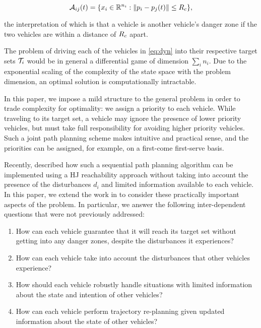 \begin{equation}
\mathcal{A}_{ij}(t) = \{x_i \in \mathbb{R}^{n_i}: \|p_i - p_j(t)\| \le R_c \},
\end{equation}

\noindent the interpretation of which is that a vehicle is another vehicle's danger zone if the two vehicles are within a distance of $R_c$ apart.

The problem of driving each of the vehicles in \eqref{eq:dyn} into their respective target sets $\mathcal{T}_i$ would be in general a differential game of dimension $\sum_i n_i$. Due to the exponential scaling of the complexity of the state space with the problem dimension, an optimal solution is computationally intractable.

In this paper, we impose a mild structure to the general problem in order to trade complexity for optimality: we assign a priority to each vehicle. While traveling to its target set, a vehicle may ignore the presence of lower priority vehicles, but must take full responsibility for avoiding higher priority vehicles. Such a joint path planning scheme makes intuitive and practical sense, and the priorities can be assigned, for example, on a first-come first-serve basis.

Recently, \cite{Chen15} described how such a sequential path planning algorithm can be implemented using a HJ reachability approach without taking into account the presence of the disturbances $d_i$ and limited information available to each vehicle. In this paper, we extend the work in \cite{Chen15} to consider these practically important aspects of the problem. In particular, we answer the following inter-dependent questions that were not previously addressed:

\begin{enumerate}
\item How can each vehicle guarantee that it will reach its target set without getting into any danger zones, despite the disturbances it experiences?
\item How can each vehicle take into account the disturbances that other vehicles experience?
\item How should each vehicle robustly handle situations with limited information about the state and intention of other vehicles?
\item How can each vehicle perform trajectory re-planning given updated information about the state of other vehicles?
\end{enumerate}